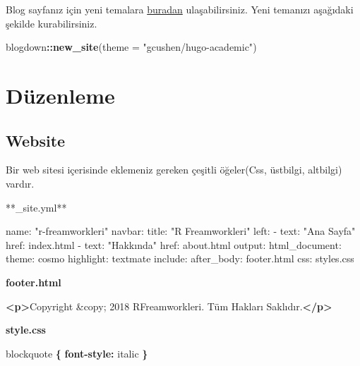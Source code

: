 \documentclass[]{book}
\newenvironment{Shaded}{\begin{snugshade}}{\end{snugshade}}
\newcommand{\KeywordTok}[1]{\textcolor[rgb]{0.13,0.29,0.53}{\textbf{#1}}}
\newcommand{\DataTypeTok}[1]{\textcolor[rgb]{0.13,0.29,0.53}{#1}}
\newcommand{\DecValTok}[1]{\textcolor[rgb]{0.00,0.00,0.81}{#1}}
\newcommand{\BaseNTok}[1]{\textcolor[rgb]{0.00,0.00,0.81}{#1}}
\newcommand{\StringTok}[1]{\textcolor[rgb]{0.31,0.60,0.02}{#1}}
\newcommand{\OperatorTok}[1]{\textcolor[rgb]{0.81,0.36,0.00}{\textbf{#1}}}
\newcommand{\NormalTok}[1]{#1}
\begin{document}
Blog sayfanız için yeni temalara
\href{http://themes.gohugo.io/}{buradan} ulaşabilirsiniz. Yeni temanızı
aşağıdaki şekilde kurabilirsiniz.

\begin{Shaded}
\begin{Highlighting}[]
\NormalTok{blogdown}\OperatorTok{::}\KeywordTok{new_site}\NormalTok{(}\DataTypeTok{theme =} \StringTok{"gcushen/hugo-academic"}\NormalTok{)}
\end{Highlighting}
\end{Shaded}

\section{Düzenleme}\label{duzenleme-3}

\subsection{Website}\label{website-1}

Bir web sitesi içerisinde eklemeniz gereken çeşitli öğeler(Css,
üstbilgi, altbilgi) vardır.

**\_site.yml**

\begin{Shaded}
\begin{Highlighting}[]
\NormalTok{name: "r-freamworkleri"}
\NormalTok{navbar:}
\NormalTok{  title: "R Freamworkleri"}
\NormalTok{  left:}
\BaseNTok{    - text: "Ana Sayfa"}
\BaseNTok{      href: index.html}
\BaseNTok{    - text: "Hakkında"}
\BaseNTok{      href: about.html}
\NormalTok{output:}
\NormalTok{  html_document:}
\BaseNTok{    theme: cosmo}
\BaseNTok{    highlight: textmate}
\BaseNTok{    include:}
\BaseNTok{      after_body: footer.html}
\BaseNTok{    css: styles.css}
\end{Highlighting}
\end{Shaded}

\textbf{footer.html}

\begin{Shaded}
\begin{Highlighting}[]
\KeywordTok{<p>}\NormalTok{Copyright }\DecValTok{&copy;}\NormalTok{ 2018 RFreamworkleri. Tüm Hakları Saklıdır.}\KeywordTok{</p>}
\end{Highlighting}
\end{Shaded}

\textbf{style.css}

\begin{Shaded}
\begin{Highlighting}[]
\NormalTok{blockquote }\KeywordTok{\{}
  \KeywordTok{font-style:} \DataTypeTok{italic}
\KeywordTok{\}}
\end{Highlighting}
\end{Shaded}
\end{document}

